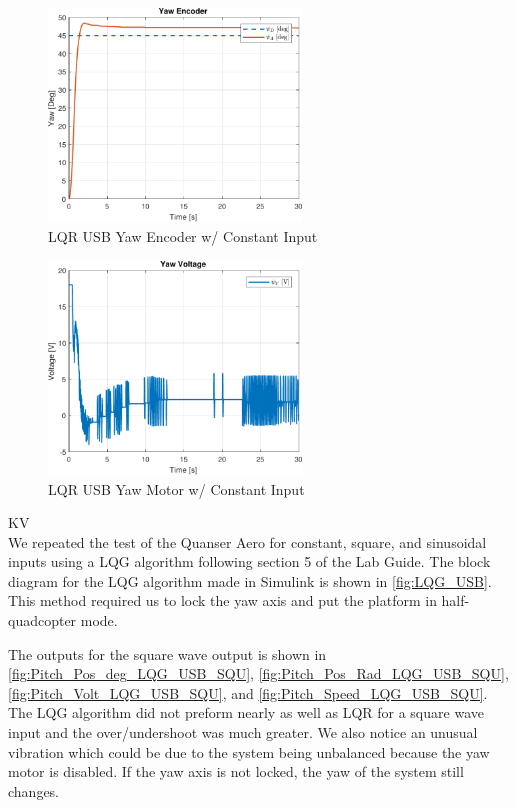 \documentclass[fontsize=11pt, %
                             paper=letter, %
                             openany, %
                             captions=tableheading,
                             index=totoc,
                             hyperref]{labbook}
\begin{document}
\begin{addmargin}[0cm]{0cm}
\begin{figure}[H]
  \centering
  \includegraphics[width=0.6\textwidth]{figs/matlab/LQR/P_USB/Yaw_Pos_LQR_USB_CON}
  \caption{LQR USB Yaw Encoder w/ Constant Input}
  \label{fig:Yaw_Pos_LQR_USB_CON}
\end{figure}

\begin{figure}[H]
  \centering
  \includegraphics[width=0.6\textwidth]{figs/matlab/LQR/P_USB/Yaw_Volt_LQR_USB_CON}
  \caption{LQR USB Yaw Motor w/ Constant Input}
  \label{fig:Yaw_Volt_LQR_USB_CON}
\end{figure}

KV\\
We repeated the test of the Quanser Aero for constant, square, and sinusoidal inputs using a LQG algorithm following section 5 of the Lab Guide\cite{LQR_Lab_Guide}.  The block diagram for the LQG algorithm made in Simulink is shown in \autoref{fig:LQG_USB}.  This method required us to lock the yaw axis and put the platform in half-quadcopter mode.

The outputs for the square wave output is shown in
\autoref{fig:Pitch_Pos_deg_LQG_USB_SQU},
\autoref{fig:Pitch_Pos_Rad_LQG_USB_SQU},
\autoref{fig:Pitch_Volt_LQG_USB_SQU}, and
\autoref{fig:Pitch_Speed_LQG_USB_SQU}.  
The LQG algorithm did not preform nearly as well as LQR for a square wave input and the over/undershoot was much greater.  We also notice an unusual vibration which could be due to the system being unbalanced because the yaw motor is disabled.  If the yaw axis is not locked, the yaw of the system still changes.


\end{addmargin}
\end{document}
